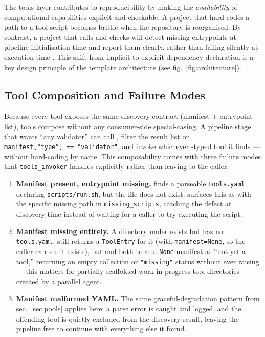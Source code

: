 \documentclass[
]{article}
\providecommand{\tightlist}{%
  \setlength{\itemsep}{0pt}\setlength{\parskip}{0pt}}
\begin{document}
The tools layer contributes to reproducibility by making the
\emph{availability} of computational capabilities explicit and
checkable. A project that hard-codes a path to a tool script becomes
brittle when the repository is reorganised. By contrast, a project that
calls  and checks
 will detect missing
entrypoints at pipeline initialisation time and report them clearly,
rather than failing silently at execution time
\citep{Stodden2016enhancing}. This shift from implicit to explicit
dependency declaration is a key design principle of the template
architecture (see fig.~\ref{fig:architecture}).

\subsection{Tool Composition and Failure
Modes}\label{tool-composition-and-failure-modes}

Because every tool exposes the same discovery contract (manifest +
entrypoint list), tools compose without any consumer-side
special-casing. A pipeline stage that wants ``any validator'' can call
, filter the result list on
\texttt{manifest{[}"type"{]}\ ==\ "validator"}, and invoke whichever
-typed tool it finds --- without hard-coding
 by name. This composability comes with
three failure modes that \texttt{tools\_invoker} handles explicitly
rather than leaving to the caller:

\begin{enumerate}
\def\labelenumi{\arabic{enumi}.}
\tightlist
\item
  \textbf{Manifest present, entrypoint missing.}
   finds a parseable \texttt{tools.yaml}
  declaring \texttt{scripts/run.sh}, but the file does not exist.
   surfaces this as
   with the specific missing path in
  \texttt{missing\_scripts}, catching the defect at discovery time
  instead of waiting for a caller to try executing the script.
\item
  \textbf{Manifest missing entirely.} A directory under
   exists but has no \texttt{tools.yaml}.
   still returns a \texttt{ToolEntry} for it
  (with \texttt{manifest=None}, so the caller can see it exists), but
   and
   both treat a \texttt{None}
  manifest as ``not yet a tool,'' returning an empty collection or
  \texttt{"missing"} status without ever raising --- this matters for
  partially-scaffolded work-in-progress tool directories created by a
  parallel agent.
\item
  \textbf{Manifest malformed YAML.} The same graceful-degradation
  pattern from sec.~\ref{sec:pools} applies here: a parse error is
  caught and logged, and the offending tool is quietly excluded from the
  discovery result, leaving the pipeline free to continue with
  everything else it found.
\end{enumerate}
\end{document}
